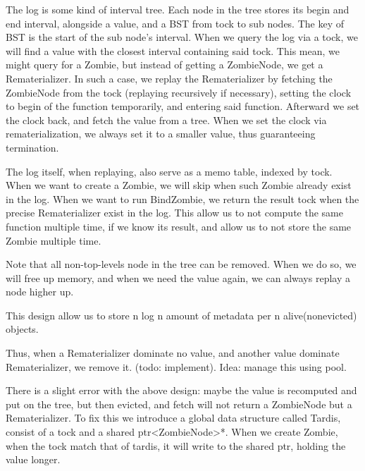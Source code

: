 \documentclass[acmsmall]{acmart}
\begin{document}
	The log is some kind of interval tree. Each node in the tree stores its begin and end interval, alongside a value, and a BST from tock to sub nodes. The key of BST is the start of the sub node’s interval. When we query the log via a tock, we will find a value with the closest interval containing said tock. This mean, we might query for a Zombie, but instead of getting a ZombieNode, we get a Rematerializer.
	In such a case, we replay the Rematerializer by fetching the ZombieNode from the tock (replaying recursively if necessary), setting the clock to begin of the function temporarily, and entering said function. Afterward we set the clock back, and fetch the value from a tree.
	When we set the clock via rematerialization, we always set it to a smaller value, thus guaranteeing termination.
	
	The log itself, when replaying, also serve as a memo table, indexed by tock. When we want to create a Zombie, we will skip when such Zombie already exist in the log. When we want to run BindZombie, we return the result tock when the precise Rematerializer exist in the log. This allow us to not compute the same function multiple time, if we know its result, and allow us to not store the same Zombie multiple time.
	
	Note that all non-top-levels node in the tree can be removed. When we do so, we will free up memory, and when we need the value again, we can always replay a node higher up.
	
	This design allow us to store n log n amount of metadata per n alive(nonevicted) objects.
	
	Thus, when a Rematerializer dominate no value, and another value dominate Rematerializer, we remove it. (todo: implement). Idea: manage this using pool.
	
	There is a slight error with the above design: maybe the value is recomputed and put on the tree, but then evicted, and fetch will not return a ZombieNode but a Rematerializer. To fix this we introduce a global data structure called Tardis, consist of a tock and a shared ptr<ZombieNode>*. When we create Zombie, when the tock match that of tardis, it will write to the shared ptr, holding the value longer.
	
\appendix
\end{document}
